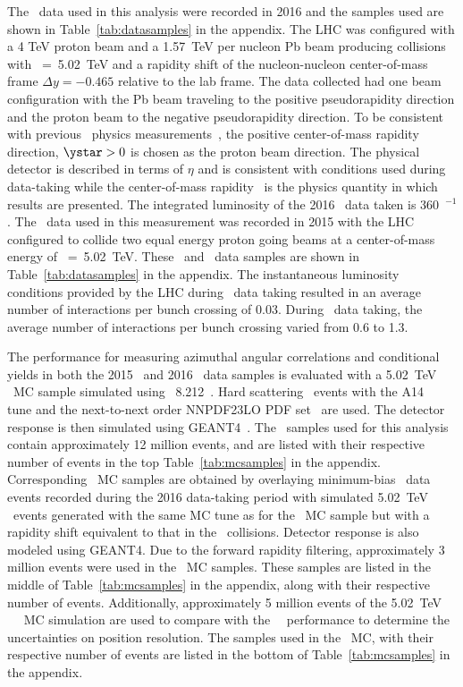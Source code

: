 The \pPb\ data used in this analysis were recorded in 2016 and the samples used are shown in Table~\ref{tab:datasamples} in the appendix. The LHC was configured with a 4 TeV proton beam and a 1.57~TeV per nucleon Pb beam  producing collisions with \sqrtsnn~=~5.02~TeV and a rapidity shift of the  nucleon-nucleon center-of-mass frame $\Delta y=-0.465$ relative to the lab frame. The data collected had one beam configuration with the Pb beam traveling to the positive pseudorapidity direction and the proton beam to the negative pseudorapidity direction. To be consistent with previous \pPb\ physics measurements~\cite{ATLAS:2014cpa,Aaboud:2017tke}, the positive center-of-mass rapidity direction, $\ystar>0$ is chosen as the proton beam direction. The physical detector is described in terms of $\eta$ and is consistent with conditions used during data-taking while the center-of-mass rapidity \ystar\ is the physics quantity in which results are presented. The integrated luminosity of the 2016 \pPb\ data taken is 360~\mubarn$^{-1}$. The \pp\ data used in this measurement was recorded in 2015 with the LHC configured to collide two equal energy proton going beams at a center-of-mass energy of \sqrts~=~5.02~TeV. These \pp\ and \pPb\ data samples are shown in Table~\ref{tab:datasamples} in the appendix. The instantaneous luminosity conditions provided by the LHC during \pPb\ data taking resulted in an average number of interactions per bunch crossing of 0.03. During \pp\ data taking, the average number of interactions per bunch crossing varied from 0.6 to 1.3. 

The performance for measuring azimuthal angular correlations and conditional yields in both the 2015  \pp\ and 2016 \pPb\ data samples is evaluated with a 5.02~TeV \pp\ MC sample simulated using \pythia\ 8.212~\cite{Sjostrand:2014zea}. Hard scattering \pp\ events with the A14~\cite{ATLAS2014021} tune and the next-to-next order NNPDF23LO PDF set~\cite{Ball:2012cx} are used. The detector response is then simulated using GEANT4~\cite{Agostinelli:2002hh,Aad:2010ah}. The \pp\ samples used for this analysis contain approximately 12 million events, and are listed with their respective number of events in the top Table~\ref{tab:mcsamples} in the appendix. Corresponding \pPb\ MC samples are obtained by overlaying minimum-bias \pPb\ data events recorded during the 2016 data-taking period with simulated 5.02~TeV \pp\ events generated with the same MC tune as for the \pp\ MC sample but with a rapidity shift equivalent to that in the \pPb\ collisions. Detector response is also modeled using GEANT4. Due to the forward rapidity filtering, approximately 3 million events were used in the \pPb\ MC samples. These samples are listed in the middle of Table~\ref{tab:mcsamples} in the appendix, along with their respective number of events. Additionally, approximately 5 million events of the 5.02~TeV \pp\ \herwig~\cite{Bahr:2008pv} MC simulation are used to compare with the \pp\ \pythiaeight\ performance to determine the uncertainties on position resolution. The samples used in the \herwig\ MC, with their respective number of events are listed in the bottom of Table~\ref{tab:mcsamples} in the appendix.

